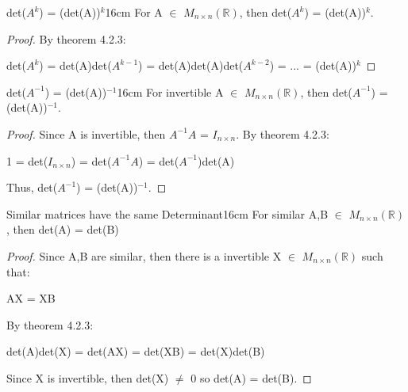     \vspace{0.5cm}



    \begin{corollary}{det($A^k$) = (det(A))$^k$}{16cm}
        For A $\in$ $M_{n \times n}(\mathbb{R})$,
        then det($A^k$) = (det(A))$^k$.
    \end{corollary}

    \begin{proof}
        By {\color{red} theorem 4.2.3}:

        \hspace{0.5cm}
        det($A^k$)
        = det(A)det($A^{k-1}$)
        = det(A)det(A)det($A^{k-2}$)
        = ...
        = (det(A))$^k$
    \end{proof}

    \vspace{0.5cm}



    \begin{corollary}{det($A^{-1}$) = (det(A))$^{-1}$}{16cm}
        For invertible A $\in$ $M_{n \times n}(\mathbb{R})$,
        then det($A^{-1}$) = (det(A))$^{-1}$.
    \end{corollary}

    \begin{proof}
        Since A is invertible, then $A^{-1}A$ = $I_{n \times n}$.
        By {\color{red} theorem 4.2.3}:

        \hspace{0.5cm}
        1 = det($I_{n \times n}$)
        = det($A^{-1}A$)
        = det($A^{-1}$)det(A)

        Thus, det($A^{-1}$) = (det(A))$^{-1}$.
    \end{proof}

    \vspace{0.5cm}



    \begin{corollary}{Similar matrices have the same Determinant}{16cm}
        For similar A,B $\in$ $M_{n \times n}(\mathbb{R})$,
        then det(A) = det(B)
    \end{corollary}

    \begin{proof}
        Since A,B are similar, then there is a
        invertible X $\in$ $M_{n \times n}(\mathbb{R})$ such that:

        \hspace{0.5cm}
        AX = XB

        By {\color{red} theorem 4.2.3}:

        \hspace{0.5cm}
        det(A)det(X)
        = det(AX)
        = det(XB)
        = det(X)det(B)

        Since X is invertible, then det(X) $\not =$ 0 so det(A) = det(B).
    \end{proof}

